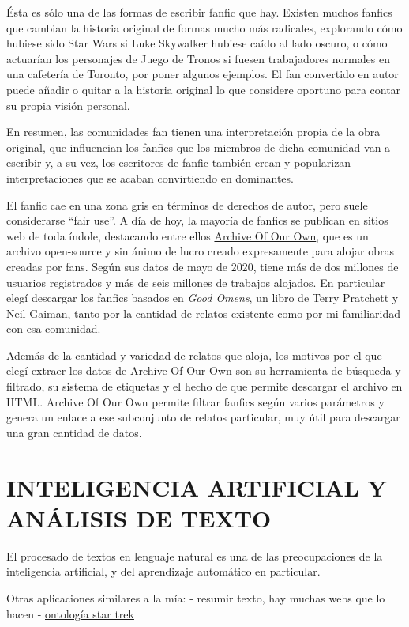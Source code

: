 \documentclass{pre-tfg}
\begin{document}
Ésta es sólo una de las formas de escribir fanfic que hay. Existen muchos fanfics que cambian la historia original de formas mucho más radicales, explorando cómo hubiese sido Star Wars si Luke Skywalker hubiese caído al lado oscuro, o cómo actuarían los personajes de Juego de Tronos si fuesen trabajadores normales en una cafetería de Toronto, por poner algunos ejemplos. El fan convertido en autor puede añadir o quitar a la historia original lo que considere oportuno para contar su propia visión personal.

En resumen, las comunidades fan tienen una interpretación propia de la obra original, que influencian los fanfics que los miembros de dicha comunidad van a escribir y, a su vez, los escritores de fanfic también crean y popularizan interpretaciones que se acaban convirtiendo en dominantes. 



El fanfic cae en una zona gris en términos de derechos de autor, pero suele considerarse “fair use”. A día de hoy, la mayoría de fanfics se publican en sitios web de toda índole, destacando entre ellos \href{archiveofourown.org}{Archive Of Our Own}, que es un archivo open-source y sin ánimo de lucro creado expresamente para alojar obras creadas por fans. Según sus datos de mayo de 2020, tiene más de dos millones de usuarios registrados y más de seis millones de trabajos alojados. En particular elegí descargar los fanfics basados en \textit{Good Omens}, un libro de Terry Pratchett y Neil Gaiman, tanto por la cantidad de relatos existente como por mi familiaridad con esa comunidad.

Además de la cantidad y variedad de relatos que aloja, los motivos por el que elegí extraer los datos de Archive Of Our Own son su herramienta de búsqueda y filtrado, su sistema de etiquetas y el hecho de que permite descargar el archivo en HTML. Archive Of Our Own permite filtrar fanfics según varios parámetros y genera un enlace a ese subconjunto de relatos particular, muy útil para descargar una gran cantidad de datos.

\section{INTELIGENCIA ARTIFICIAL Y ANÁLISIS DE TEXTO}

El procesado de textos en lenguaje natural es una de las preocupaciones de la inteligencia artificial, y del aprendizaje automático en particular. 

Otras aplicaciones similares a la mía:
- resumir texto, hay muchas webs que lo hacen
- \href{https://pr-owl.org/basics/ontostartrek.php}{ontología star trek}
\end{document}
